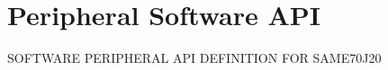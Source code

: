 \hypertarget{group__SAME70J20__api}{}\section{Peripheral Software A\+PI}
\label{group__SAME70J20__api}
S\+O\+F\+T\+W\+A\+RE P\+E\+R\+I\+P\+H\+E\+R\+AL A\+PI D\+E\+F\+I\+N\+I\+T\+I\+ON F\+OR S\+A\+M\+E70\+J20 